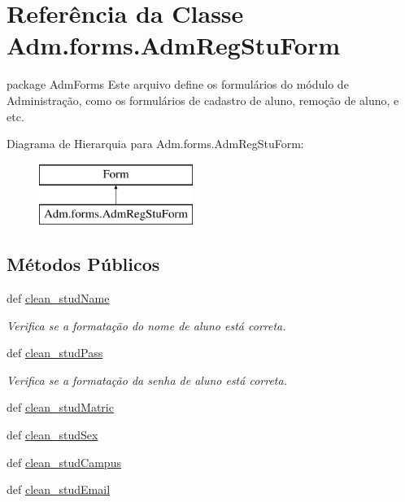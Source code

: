 \hypertarget{classAdm_1_1forms_1_1AdmRegStuForm}{\section{Referência da Classe Adm.\-forms.\-Adm\-Reg\-Stu\-Form}
\label{classAdm_1_1forms_1_1AdmRegStuForm}
}


package Adm\-Forms Este arquivo define os formulários do módulo de Administração, como os formulários de cadastro de aluno, remoção de aluno, e etc.  


Diagrama de Hierarquia para Adm.\-forms.\-Adm\-Reg\-Stu\-Form\-:\begin{figure}[H]
\begin{center}
\leavevmode
\includegraphics[height=2.000000cm]{d0/d94/classAdm_1_1forms_1_1AdmRegStuForm}
\end{center}
\end{figure}
\subsection*{Métodos Públicos}
\begin{DoxyCompactItemize}
\item 
def \hyperlink{classAdm_1_1forms_1_1AdmRegStuForm_acf7d90895b102b79c853f83ac62d301b}{clean\-\_\-stud\-Name}
\begin{DoxyCompactList}\small\item\em Verifica se a formatação do nome de aluno está correta. \end{DoxyCompactList}\item 
def \hyperlink{classAdm_1_1forms_1_1AdmRegStuForm_a02518090b354e902fa6ed4d23ec4c0bf}{clean\-\_\-stud\-Pass}
\begin{DoxyCompactList}\small\item\em Verifica se a formatação da senha de aluno está correta. \end{DoxyCompactList}\item 
def \hyperlink{classAdm_1_1forms_1_1AdmRegStuForm_a278640fd2d8b3e9bc885520ee8ea47a8}{clean\-\_\-stud\-Matric}
\item 
def \hyperlink{classAdm_1_1forms_1_1AdmRegStuForm_aafae355caee4bf30ee8dad11e9feb4a7}{clean\-\_\-stud\-Sex}
\item 
def \hyperlink{classAdm_1_1forms_1_1AdmRegStuForm_a01013957e80d5d9e306861c3688503e1}{clean\-\_\-stud\-Campus}
\item 
def \hyperlink{classAdm_1_1forms_1_1AdmRegStuForm_a8f3b0dc4771aa8746b683a7062700cfc}{clean\-\_\-stud\-Email}
\end{DoxyCompactItemize}
